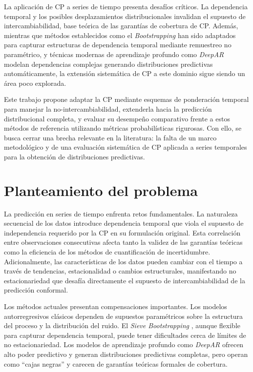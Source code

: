 La aplicación de CP a series de tiempo presenta desafíos críticos. La dependencia temporal y los posibles desplazamientos distribucionales invalidan el supuesto de intercambiabilidad, base teórica de las garantías de cobertura de CP. Además, mientras que métodos establecidos como el \textit{Bootstrapping} \parencite{Lahiri2003} han sido adaptados para capturar estructuras de dependencia temporal mediante remuestreo no paramétrico, y técnicas modernas de aprendizaje profundo como \textit{DeepAR} \parencite{Salinas2020} modelan dependencias complejas generando distribuciones predictivas automáticamente, la extensión sistemática de CP a este dominio sigue siendo un área poco explorada.

Este trabajo propone adaptar la CP mediante esquemas de ponderación temporal para manejar la no-intercambiabilidad, extenderla hacia la predicción distribucional completa, y evaluar su desempeño comparativo frente a estos métodos de referencia utilizando métricas probabilísticas rigurosas. Con ello, se busca cerrar una brecha relevante en la literatura: la falta de un marco metodológico y de una evaluación sistemática de CP aplicada a series temporales para la obtención de distribuciones predictivas.

\section{Planteamiento del problema}

La predicción en series de tiempo enfrenta retos fundamentales. La naturaleza secuencial de los datos introduce dependencia temporal que viola el supuesto de independencia requerido por la CP en su formulación original. Esta correlación entre observaciones consecutivas afecta tanto la validez de las garantías teóricas como la eficiencia de los métodos de cuantificación de incertidumbre. Adicionalmente, las características de los datos pueden cambiar con el tiempo a través de tendencias, estacionalidad o cambios estructurales, manifestando no estacionariedad que desafía directamente el supuesto de intercambiabilidad de la predicción conformal.

Los métodos actuales presentan compensaciones importantes. Los modelos autorregresivos clásicos dependen de supuestos paramétricos sobre la estructura del proceso y la distribución del ruido. El \textit{Sieve Bootstrapping} \parencite{Lahiri2003}, aunque flexible para capturar dependencia temporal, puede tener dificultades cerca de límites de no estacionariedad. Los modelos de aprendizaje profundo como \textit{DeepAR} \parencite{Salinas2020} ofrecen alto poder predictivo y generan distribuciones predictivas completas, pero operan como ``cajas negras'' y carecen de garantías teóricas formales de cobertura.

